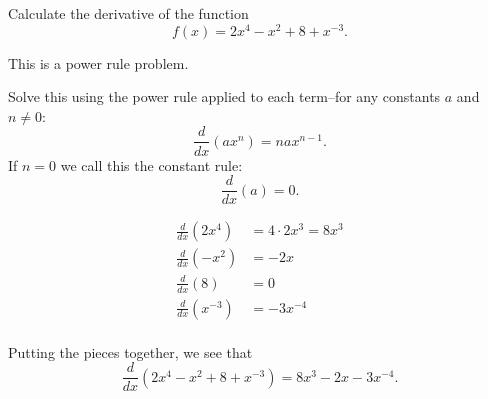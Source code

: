 \documentclass{ximera}
\author{Emma Smith Zbarsky}
\begin{document}
\begin{exercise}

Calculate the derivative of the function \[f(x) = 2x^4-x^2+8+x^{-3}.\]


\begin{hint}
This is a power rule problem.
\end{hint}


\begin{hint}
Solve this using the power rule applied to each term--for any constants
$a$ and $n \neq 0$: \[\frac{d}{dx}\left(ax^n\right) = nax^{n-1}.\] If
$n=0$ we call this the constant rule:\[\frac{d}{dx}\left(a\right) = 0.\]

\begin{align*}
\frac{d}{dx}\left(2x^4\right) &= 4\cdot 2x^3 = 8x^3 \\
\frac{d}{dx}\left(-x^2\right) &= -2x \\
\frac{d}{dx}\left(8\right) &= 0 \\
\frac{d}{dx}\left(x^{-3}\right) &= -3x^{-4} \\
\end{align*}

Putting the pieces together, we see that
\[\frac{d}{dx}\left(2x^4-x^2+8+x^{-3}\right) = \boxed{8x^3-2x-3x^{-4}}.\]
\end{hint}


\begin{multipleChoice}
\end{multipleChoice}

\end{exercise}
\end{document}
